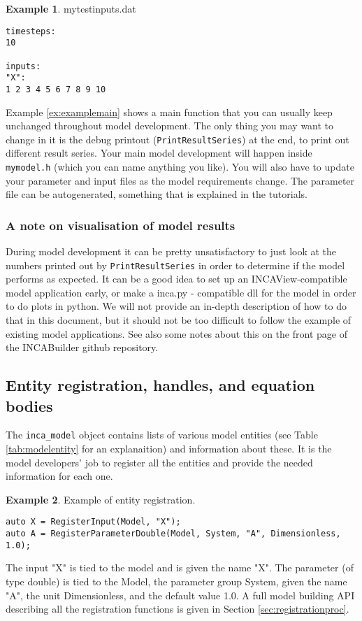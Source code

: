 \documentclass[11pt]{article}
\theoremstyle{definition}
\newtheorem{myexample}{Example}
\newenvironment{example}%
  {\begin{lrbox}{\examplebox}%
   \begin{minipage}{\dimexpr\linewidth-2\fboxsep}
   \begin{myexample}}%
  {\end{myexample}%
   \end{minipage}%
   \end{lrbox}%
   \begin{trivlist}
     \item[]\colorbox{silver}{\usebox\examplebox}
   \end{trivlist}}
\begin{document}
\begin{example}
mytestinputs.dat
\begin{lstlisting}[style=textstyle]
timesteps:
10

inputs:
"X":
1 2 3 4 5 6 7 8 9 10
\end{lstlisting}
\end{example}

Example \ref{ex:examplemain} shows a main function that you can usually keep unchanged throughout model development. The only thing you may want to change in it is the debug printout ({\tt PrintResultSeries}) at the end, to print out different result series. Your main model development will happen inside {\tt mymodel.h} (which you can name anything you like). You will also have to update your parameter and input files as the model requirements change. The parameter file can be autogenerated, something that is explained in the tutorials.

\subsubsection{A note on visualisation of model results}

During model development it can be pretty unsatisfactory to just look at the numbers printed out by {\tt PrintResultSeries} in order to determine if the model performs as expected. It can be a good idea to set up an INCAView-compatible model application early, or make a inca.py - compatible dll for the model in order to do plots in python. We will not provide an in-depth description of how to do that in this document, but it should not be too difficult to follow the example of existing model applications. See also some notes about this on the front page of the INCABuilder github repository.

\subsection{Entity registration, handles, and equation bodies}\label{sec:registrationandhandles}

The {\tt inca\_model} object contains lists of various model entities (see Table \ref{tab:modelentity} for an explanaition) and information about these. It is the model developers' job to register all the entities and provide the needed information for each one.

\begin{example}\label{ex:registration}
Example of entity registration.
\begin{lstlisting}[style=mycpp]
auto X = RegisterInput(Model, "X");
auto A = RegisterParameterDouble(Model, System, "A", Dimensionless, 1.0);
\end{lstlisting}
The input "X" is tied to the model and is given the name "X". The parameter (of type double) is tied to the Model, the parameter group System, given the name "A", the unit Dimensionless, and the default value 1.0. A full model building API describing all the registration functions is given in Section \ref{sec:registrationproc}.
\end{example}
\end{document}

